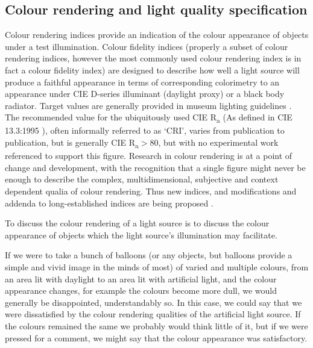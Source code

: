 \subsection{Colour rendering and light quality specification}

Colour rendering indices provide an indication of the colour appearance of objects under a test illumination. Colour fidelity indices (properly a subset of colour rendering indices, however the most commonly used colour rendering index is in fact a colour fidelity index) are designed to describe how well a light source will produce a faithful appearance in terms of corresponding colorimetry to an appearance under CIE D-series illuminant (daylight proxy) or a black body radiator. Target values are generally provided in museum lighting guidelines \citep{ies_ies_1996,druzik_guidelines_2012,cibse_lighting_2015,thomson_museum_1986}. The recommended value for the ubiquitously used CIE R\textsubscript{a} (As defined in CIE 13.3:1995 \citep{cie_cie_1995}), often informally referred to as `CRI', varies from publication to publication, but is generally CIE R\textsubscript{a}$>$80, but with no experimental work referenced to support this figure. Research in colour rendering is at a point of change and development, with the recognition that a single figure might never be enough to describe the complex, multidimensional, subjective and context dependent qualia of colour rendering\citep{rea_color_2008}. Thus new indices, and modifications and addenda to long-established indices are being proposed \citep{smet_memory_2012,davis_color_2010,rea_practical_2010,color_metric_task_group_of_the_ies_ies_2015,teunissen_characterising_2016}.

To discuss the colour rendering of a light source is to discuss the colour appearance of objects which the light source's illumination may facilitate. 

If we were to take a bunch of balloons (or any objects, but balloons provide a simple and vivid image in the minds of most) of varied and multiple colours, from an area lit with daylight to an area lit with artificial light, and the colour appearance changes, for example the colours become more dull, we would generally be disappointed, understandably so. In this case, we could say that we were dissatisfied by the colour rendering qualities of the artificial light source. If the colours remained the same we probably would think little of it, but if we were pressed for a comment, we might say that the colour appearance was satisfactory.

